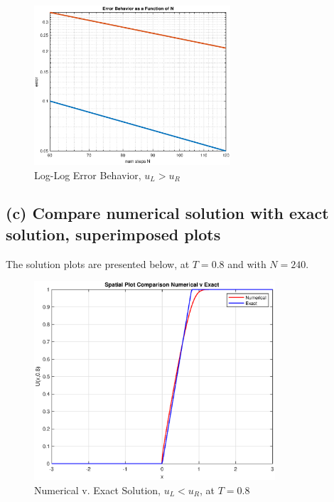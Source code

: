 \documentclass[12pt]{article} %
\begin{document}
\begin{figure}[h!]
\caption{Log-Log Error Behavior, $u_L > u_R$}
\centering
\includegraphics[width=0.65\textwidth]{converge2.eps}
\end{figure}
\newpage

\subsection{(c) Compare numerical solution with exact solution, superimposed plots}
The solution plots are presented below, at $T=0.8$ and with $N=240$.

\begin{figure}[h!]
\caption{Numerical v. Exact Solution, $u_L < u_R$, at $T = 0.8$}
\centering
\includegraphics[width=0.8\textwidth]{compare2_2.eps}
\end{figure}
\end{document}
